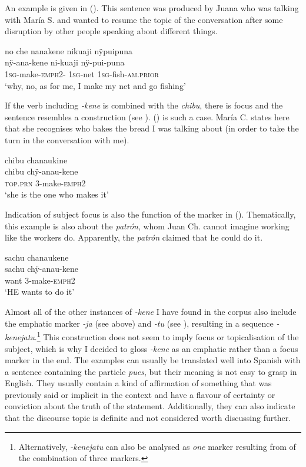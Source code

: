 An example is given in (). This sentence was produced by Juana who was talking with María S. and wanted to resume the topic of the conversation after some disruption by other people speaking about different things.

\newpage
\ea\label{ex:NMLZ-s1}
\begingl
\glpreamble no che nanakene nikuaji nÿpuipuna\\
 nÿ-ana-kene ni-kuaji nÿ-pui-puna\\
 1\textsc{sg}-make-\textsc{emph}2- 1\textsc{sg}-net 1\textsc{sg}-fish-\textsc{am.prior}\\
\glft ‘why, no, as for me, I make my net and go fishing’
\endgl
{}
\xe

If the verb including \textit{-kene} is combined with the  \textit{chibu}, there is  focus and the sentence resembles a  construction (see ). () is such a case.  María C. states here that she recognises who bakes the bread I was talking about (in order to take the turn in the conversation with me).

\ea\label{ex:NMLZ-s2}
\begingl
\glpreamble chibu chanaukine\\
\gla chibu chÿ-anau-kene\\
\textsc{top.prn} 3-make-\textsc{emph}2\\
\glft ‘she is the one who makes it’
\endgl
\trailingcitation{[uxx-e120427l.127]}
\xe

Indication of subject focus is also the function of the marker in (). Thematically, this example is also about the \textit{patrón}, whom Juan Ch. cannot imagine working like the workers do. Apparently, the \textit{patrón} claimed that he could do it.

\ea\label{ex:NMLZ-c1}
\begingl
\glpreamble sachu chanaukene\\
\gla sachu chÿ-anau-kene\\
\glb want 3-make-\textsc{emph}2\\
\glft ‘HE wants to do it’
\endgl
\trailingcitation{[nxx-p630101g-1.094]}
\xe

Almost all of the other instances of \textit{-kene} I have found in the corpus also include the emphatic marker \textit{-ja} (see above) and  \textit{-tu} (see ), resulting in a sequence \textit{-kenejatu}.\footnote{Alternatively, \textit{-kenejatu} can also be analysed as \textit{one} marker resulting from  of the combination of three markers.} This construction does not seem to imply focus or topicalisation of the subject, which is why I decided to gloss \textit{-kene} as an emphatic rather than a focus marker in the end. The examples can usually be translated well into Spanish with a sentence containing the particle \textit{pues}, but their meaning is not easy to grasp in English. They usually contain a kind of affirmation of something that was previously said or implicit in the context and have a flavour of certainty or conviction about the truth of the statement. Additionally, they can also indicate that the discourse topic is definite and not considered worth discussing further.

